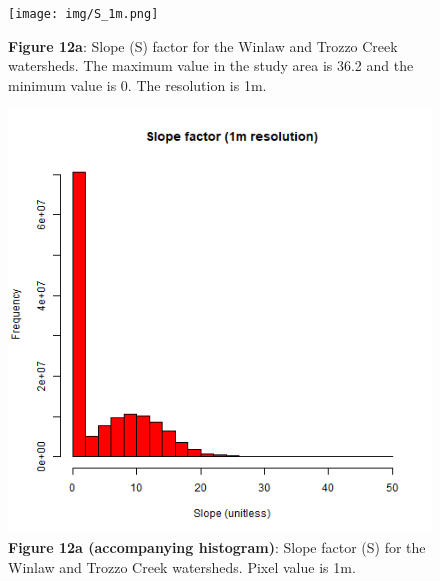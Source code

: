 \documentclass[
]{article}
\begin{document}
\begin{figure}
\centering
\texttt{[image: img/S\_1m.png]}
\caption{\textbf{Figure 12a}: Slope (S) factor for the Winlaw and Trozzo Creek watersheds. The maximum value in the study area is 36.2 and the minimum value is 0. The resolution is 1m.}
\end{figure}

\begin{figure}
\centering
\includegraphics{img/S_1m_hist.png}
\caption{\textbf{Figure 12a (accompanying histogram)}: Slope factor (S) for the Winlaw and Trozzo Creek watersheds. Pixel value is 1m.}
\end{figure}
\end{document}
